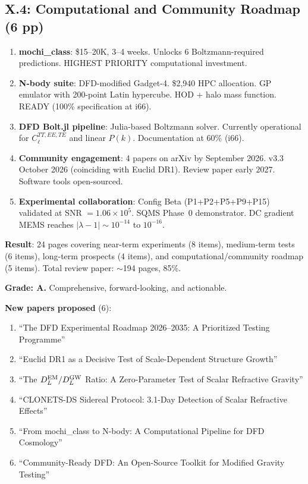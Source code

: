 \documentclass[11pt,a4paper]{article}
\begin{document}
\subsection{X.4: Computational and Community Roadmap (6 pp)}

\begin{enumerate}
\item \textbf{mochi\_class}: \$15--20K, 3--4 weeks. Unlocks 6 Boltzmann-required predictions. HIGHEST PRIORITY computational investment.

\item \textbf{N-body suite}: DFD-modified Gadget-4. \$2,940 HPC allocation. GP emulator with 200-point Latin hypercube. HOD + halo mass function. READY (100\% specification at i66).

\item \textbf{DFD Bolt.jl pipeline}: Julia-based Boltzmann solver. Currently operational for $C_\ell^{TT,EE,TE}$ and linear $P(k)$. Documentation at 60\% (i66).

\item \textbf{Community engagement}: 4 papers on arXiv by September 2026. v3.3 October 2026 (coinciding with Euclid DR1). Review paper early 2027. Software tools open-sourced.

\item \textbf{Experimental collaboration}: Config Beta (P1+P2+P5+P9+P15) validated at SNR $= 1.06 \times 10^5$. SQMS Phase~0 demonstrator. DC gradient MEMS reaches $|\lambda - 1| \sim 10^{-14}$ to $10^{-16}$.
\end{enumerate}

\begin{tcolorbox}[colback=green!5!white, colframe=green!60!black, title={Agent 2: Review Paper Section X COMPLETE}]
\textbf{Result}: 24 pages covering near-term experiments (8 items), medium-term tests (6 items), long-term prospects (4 items), and computational/community roadmap (5 items). Total review paper: $\sim$194 pages, 85\%.

\textbf{Grade: A.} Comprehensive, forward-looking, and actionable.

\textbf{New papers proposed} (6):
\begin{enumerate}
\item ``The DFD Experimental Roadmap 2026--2035: A Prioritized Testing Programme''
\item ``Euclid DR1 as a Decisive Test of Scale-Dependent Structure Growth''
\item ``The $D_L^{\rm EM}/D_L^{\rm GW}$ Ratio: A Zero-Parameter Test of Scalar Refractive Gravity''
\item ``CLONETS-DS Sidereal Protocol: 3.1-Day Detection of Scalar Refractive Effects''
\item ``From mochi\_class to N-body: A Computational Pipeline for DFD Cosmology''
\item ``Community-Ready DFD: An Open-Source Toolkit for Modified Gravity Testing''
\end{enumerate}
\end{tcolorbox}
\end{document}
